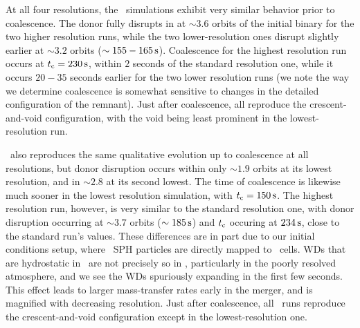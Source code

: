 At all four resolutions, the \gasoline\ simulations exhibit very similar behavior prior to coalescence.  The donor fully disrupts in at $\sim3.6$ orbits of the initial binary for the two higher resolution runs, while the two lower-resolution ones disrupt slightly earlier at $\sim3.2$ orbits ($\sim155-165\,\mathrm{s}$).  Coalescence for the highest resolution run occurs at $\tcoal = 230\,\mrm{s}$, within $2$ seconds of the standard resolution one, while it occurs $20 - 35$ seconds earlier for the two lower resolution runs (we note the way we determine coalescence is somewhat sensitive to changes in the detailed configuration of the remnant).  Just after coalescence, all reproduce the crescent-and-void configuration, with the void being least prominent in the lowest-resolution run.  

\arepo\ also reproduces the same qualitative evolution up to coalescence at all resolutions, but donor disruption occurs within only $\sim1.9$ orbits at its lowest resolution, and in $\sim2.8$ at its second lowest.  The time of coalescence is likewise much sooner in the lowest resolution simulation, with $\tcoal = 150\,\mrm{s}$.  The highest resolution run, however, is very similar to the standard resolution one, with donor disruption occurring at $\sim3.7$ orbits ($\sim185\,\mathrm{s}$) and $\tcoal$ occuring at $234\,\mathrm{s}$, close to the standard run's values.  These differences are in part due to our initial conditions setup, where \gasoline\ SPH particles are directly mapped to \arepo\ cells.  WDs that are hydrostatic in \gasoline\ are not precisely so in \arepo, particularly in the poorly resolved atmosphere, and we see the WDs spuriously expanding in the first few seconds.  This effect leads to larger mass-transfer rates early in the merger, and is magnified with decreasing resolution.  Just after coalescence, all \arepo\ runs reproduce the crescent-and-void configuration except in the lowest-resolution one.


